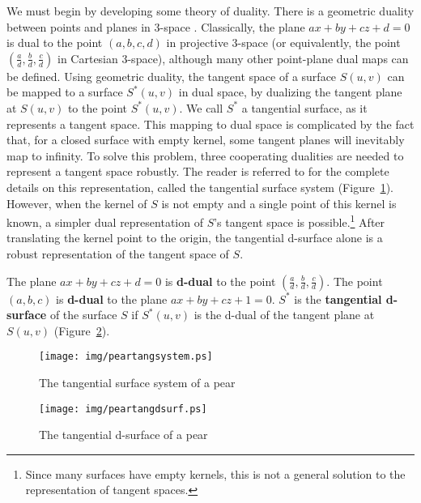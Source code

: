 \documentclass[doublespacing]{elsart}
\begin{document}
We must begin by developing some theory of duality.
There is a geometric duality between points and planes in 3-space \cite{hartshorne}.
Classically, the plane $ax+by+cz+d=0$ is dual to the point $(a,b,c,d)$ in projective 3-space
(or equivalently, the point $(\frac{a}{d},\frac{b}{d},\frac{c}{d})$ in Cartesian 3-space),
although many other point-plane dual maps can be defined.
Using geometric duality, the tangent space of a surface $S(u,v)$ can be mapped 
to a surface $S^*(u,v)$ in dual space, by dualizing the tangent plane at $S(u,v)$ to the point $S^*(u,v)$.
We call $S^*$ a tangential surface, as it represents a tangent space.
This mapping to dual space is complicated by the fact that, for a closed surface with empty kernel,
some tangent planes will inevitably map to infinity.
To solve this problem, 
three cooperating dualities are needed to represent a tangent space robustly.
The reader is referred to \cite{jj03tangsurf} for the complete details
on this representation, called the tangential surface system 
(Figure~\ref{fig:peartangsystem}).
However, when the kernel of $S$ is not empty and a single point of this
kernel is known,
a simpler dual representation of $S$'s tangent space is possible.\footnote{Since many
	surfaces have empty kernels, this is not a general solution to
	the representation of tangent spaces.}
After translating the kernel point to the origin,
the tangential d-surface alone is a robust representation of the tangent space of $S$.

\begin{defn2}
The plane $ax+by+cz+d=0$ is {\bf d-dual} to the point $(\frac{a}{d},\frac{b}{d},\frac{c}{d})$.
The point $(a,b,c)$ is {\bf d-dual} to the plane $ax+by+cz+1=0$.
$S^*$ is the {\bf tangential d-surface} of the surface $S$ if $S^*(u,v)$ 
is the d-dual of the tangent plane at $S(u,v)$ (Figure~\ref{fig:peartangdsurf}).
\end{defn2}

\begin{figure}[h]
\begin{center}
\texttt{[image: img/peartangsystem.ps]}
\end{center}
\caption{The tangential surface system of a pear}
\label{fig:peartangsystem}
\end{figure}

\begin{figure}
\begin{center}
\texttt{[image: img/peartangdsurf.ps]}
\end{center}
\caption{The tangential d-surface of a pear}
\label{fig:peartangdsurf}
\end{figure}
\end{document}
